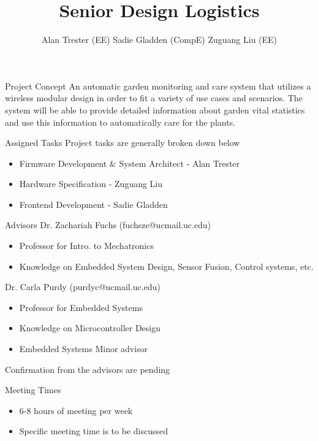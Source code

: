 \documentclass{beamer}
\title{Senior Design Logistics}
\author{Alan Trester (EE) Sadie Gladden (CompE) Zuguang Liu (EE)}
\begin{document}
	
\begin{frame}[plain]
    \maketitle
\end{frame}
\begin{frame}{Project Concept}
	An automatic garden monitoring and care system that utilizes a wireless modular design in order to fit a variety of use cases and scenarios. The system will be able to provide detailed information about garden vital statistics and use this information to automatically care for the plants.
\end{frame}

\begin{frame}{Assigned Tasks}
  Project tasks are generally broken down below
  \begin{itemize}
    \item Firmware Development \& System Architect - Alan Trester
    \item Hardware Specification - Zuguang Liu
    \item Frontend Development - Sadie Gladden
  \end{itemize}
\end{frame}

\begin{frame}{Advisors}
	Dr. Zachariah Fuchs (fuchsze@ucmail.uc.edu)
	\begin{itemize}
		\item Professor for Intro. to Mechatronics
		\item Knowledge on Embedded System Design, Sensor Fusion, Control systems, etc.
	\end{itemize}
	Dr. Carla Purdy (purdyc@ucmail.uc.edu)
	\begin{itemize}
		\item Professor for Embedded Systems
		\item Knowledge on Microcontroller Design
		\item Embedded Systems Minor advisor
	\end{itemize}
	Confirmation from the advisors are pending
\end{frame}

\begin{frame}{Meeting Times}
	\begin{itemize}
		\item 6-8 hours of meeting per week
		\item Specific meeting time is to be discussed
	\end{itemize}
\end{frame}
\end{document}
